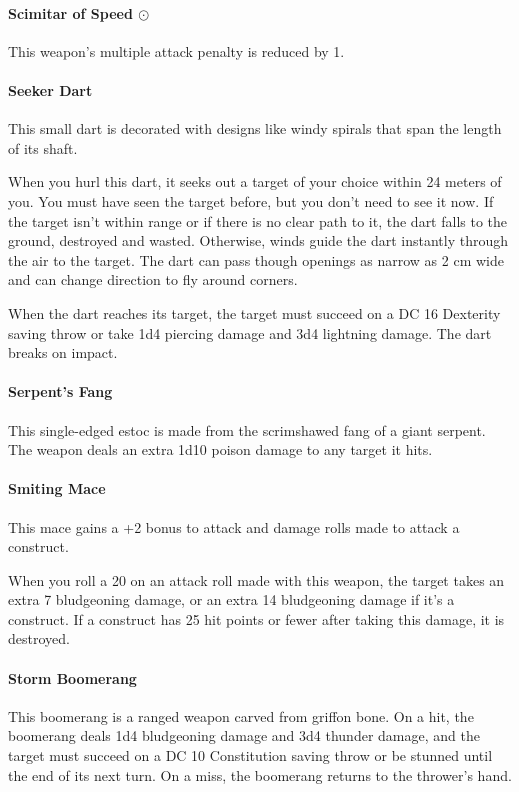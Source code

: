     \paragraph{Scimitar of Speed $\odot$}
        This weapon's multiple attack penalty is reduced by 1.
    \paragraph{Seeker Dart}
        This small dart is decorated with designs like windy spirals that span the length of its shaft.

        When you hurl this dart, it seeks out a target of your choice within 24 meters of you.
        You must have seen the target before, but you don't need to see it now.
        If the target isn't within range or if there is no clear path to it, the dart falls to the ground, destroyed and wasted.
        Otherwise, winds guide the dart instantly through the air to the target.
        The dart can pass though openings as narrow as 2 cm wide and can change direction to fly around corners.

        When the dart reaches its target, the target must succeed on a DC 16 Dexterity saving throw or take 1d4 piercing damage and 3d4 lightning damage.
        The dart breaks on impact.
    \paragraph{Serpent's Fang}
        This single-edged estoc is made from the scrimshawed fang of a giant serpent.
        The weapon deals an extra 1d10 poison damage to any target it hits.
    \paragraph{Smiting Mace}
        This mace gains a +2 bonus to attack and damage rolls made to attack a construct.

        When you roll a 20 on an attack roll made with this weapon, the target takes an extra 7 bludgeoning damage, or an extra 14 bludgeoning damage if it's a construct.
        If a construct has 25 hit points or fewer after taking this damage, it is destroyed.
    \paragraph{Storm Boomerang}
        This boomerang is a ranged weapon carved from griffon bone.
        On a hit, the boomerang deals 1d4 bludgeoning damage and 3d4 thunder damage, and the target must succeed on a DC 10 Constitution saving throw or be stunned until the end of its next turn.
        On a miss, the boomerang returns to the thrower's hand.

